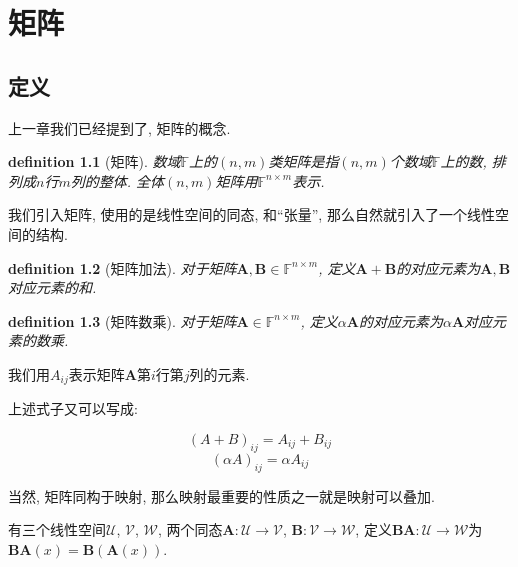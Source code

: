 \documentclass[12pt]{ctexbook}
\newtheorem{definition}{definition}
\numberwithin{definition}{section}
\numberwithin{theorem}{section}
\numberwithin{exercise}{section}
\numberwithin{example}{section}
\numberwithin{lemma}{section}
\begin{document}
    \chapter{矩阵}

    \section{定义}

    上一章我们已经提到了, 矩阵的概念.

    \begin{definition}
        [矩阵] 数域\(\mathbb{F}\)上的\((n,m)\)类矩阵是指\((n,m)\)个数域\(\mathbb{F}\)上的数, 排列成\(n\)行\(m\)列的整体.
        全体\((n,m)\)矩阵用\(\mathbb{F}^{n\times m}\)表示.
    \end{definition}

    我们引入矩阵, 使用的是线性空间的同态, 和``张量'', 那么自然就引入了一个线性空间的结构.

    \begin{definition}
        [矩阵加法] 对于矩阵\(\mathbf{A},\mathbf{B}\in\mathbb{F}^{n\times m}\), 定义\(\mathbf{A}+\mathbf{B}\)的对应元素为\(\mathbf{A},\mathbf{B}\)对应元素的和.
    \end{definition}

    \begin{definition}
        [矩阵数乘] 对于矩阵\(\mathbf{A}\in\mathbb{F}^{n\times m}\), 定义\(\alpha\mathbf{A}\)的对应元素为\(\alpha\mathbf{A}\)对应元素的数乘.
    \end{definition}

    我们用\(A_{ij}\)表示矩阵\(\boldsymbol{A}\)第\(i\)行第\(j\)列的元素.

    上述式子又可以写成:
    
    \begin{equation}
        {(A+B)}_{ij} = A_{ij} + B_{ij}
    \end{equation}
    \begin{equation}
        {(\alpha A)}_{ij} = \alpha A_{ij}
    \end{equation}

    当然, 矩阵同构于映射, 那么映射最重要的性质之一就是映射可以叠加.
    
    有三个线性空间\(\mathcal{U}\), \(\mathcal{V}\), \(\mathcal{W}\), 
    两个同态\(\mathbf{A}:\mathcal{U}\to\mathcal{V}\), \(\mathbf{B}:\mathcal{V}\to\mathcal{W}\),
    定义\(\mathbf{B}\mathbf{A}:\mathcal{U}\to\mathcal{W}\)为\(\mathbf{B}\mathbf{A}(x) = \mathbf{B}(\mathbf{A}(x))\).
\end{document}
